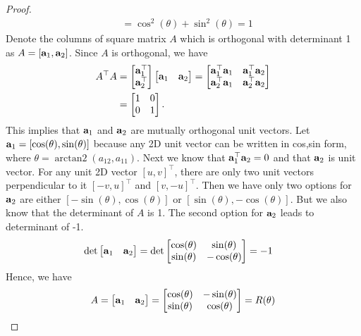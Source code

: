 \documentclass[twocolumn]{article}
\DeclareMathOperator{\atantwo}{arctan2}
\begin{document}
\begin{proof}
\begin{align}
              &= \cos^2(\theta)+  \sin^2(\theta)  = 1
      \end{align}
  Denote the columns of square matrix $A$ which  is orthogonal with determinant
  1 as $A = [\mathbf{a}_1, \mathbf{a}_2]$. Since $A$ is orthogonal,  we have
  \begin{align}
    A^\top A
    &= \begin{bmatrix}
      \mathbf{a}_1^\top  \\   \mathbf{a}_2^\top
    \end{bmatrix}
    \begin{bmatrix}
      \mathbf{a}_1  &   \mathbf{a}_2
    \end{bmatrix}  = \begin{bmatrix} \mathbf{a}_1^\top \mathbf{a}_1  & \mathbf{a}_1^\top \mathbf{a}_2
      \\
      \mathbf{a}_2^\top \mathbf{a}_1 & \mathbf{a}_2^\top \mathbf{a}_2\end{bmatrix}
      \notag\\
    &= \begin{bmatrix} 1  &  0   \\  0  &  1 \end{bmatrix}.
  \end{align}
  This   implies that $\mathbf{a}_1$  and  $\mathbf{a}_2$ are mutually orthogonal unit
  vectors. Let $\mathbf{a}_1  = [\cos(\theta), \sin(\theta)]$ because any 2D unit
  vector can  be written in cos,sin form, where $\theta = \atantwo(a_{12}, a_{11})$.
  Next we know  that  $\mathbf{a}_1^\top\mathbf{a}_2 =  0$ and that $\mathbf{a}_2$ is unit  vector.
  For any  unit 2D vector   $[u, v]^\top$, there are only two unit vectors
  perpendicular to it $[-v, u]^\top$ and $[v, -u]^\top$.
  Then we have only two
  options for $\mathbf{a}_2$  are  either $[-\sin(\theta), \cos(\theta)]$ or
  $[\sin(\theta), -\cos(\theta)]$.  But we also  know that the determinant of
  $A$ is  1. The second option   for $\mathbf{a}_2$ leads to determinant of -1.
  \begin{align}
    \det\begin{bmatrix}
      \mathbf{a}_1  &  \mathbf{a}_2
      \end{bmatrix}
    &=  
      \det\begin{bmatrix}
        \cos(\theta)  &  \sin(\theta)\\
        \sin(\theta) &  -\cos(\theta)
      \end{bmatrix} = -1
    \end{align}
    Hence, we have
    \[
      A = \begin{bmatrix}
        \mathbf{a}_1  &  \mathbf{a}_2
      \end{bmatrix}
      =  
      \begin{bmatrix}
        \cos(\theta)  &  -\sin(\theta)\\
        \sin(\theta) &  \cos(\theta)
      \end{bmatrix} = R(\theta) \]

\end{proof}
\end{document}
